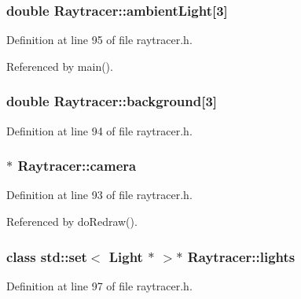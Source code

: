 \subsubsection[{ambient\+Light}]{\setlength{\rightskip}{0pt plus 5cm}double Raytracer\+::ambient\+Light[3]\hspace{0.3cm}{\ttfamily [private]}}\label{class_raytracer_a7912e30ac04157900286f2fa6eaf8ae7}


Definition at line 95 of file raytracer.\+h.



Referenced by main().

\subsubsection[{background}]{\setlength{\rightskip}{0pt plus 5cm}double Raytracer\+::background[3]\hspace{0.3cm}{\ttfamily [private]}}\label{class_raytracer_a4780e0feac28d575a53d7981113467ad}


Definition at line 94 of file raytracer.\+h.

\subsubsection[{camera}]{$\ast$ Raytracer\+::camera\hspace{0.3cm}{\ttfamily [private]}}\label{class_raytracer_aa56a6383a51f5b4f4142ff1223e7d6e7}


Definition at line 93 of file raytracer.\+h.



Referenced by do\+Redraw().

\subsubsection[{lights}]{\setlength{\rightskip}{0pt plus 5cm}class std\+::set$<$ {\bf Light} $\ast$ $>$$\ast$ Raytracer\+::lights\hspace{0.3cm}{\ttfamily [private]}}\label{class_raytracer_aec6b370de6983fda41b3705664bf2841}


Definition at line 97 of file raytracer.\+h.

